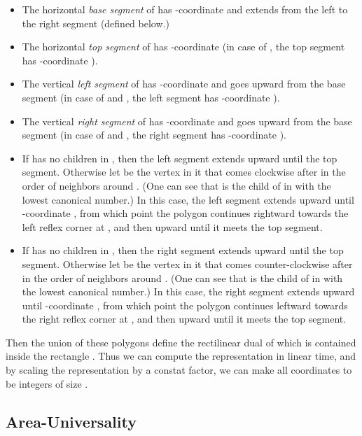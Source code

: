 \documentclass[11pt]{article}
\begin{document}
\begin{itemize}
	\item The horizontal \textit{base segment} of  has -coordinate  and extends from the left
		to the right segment (defined below.)
	\item The horizontal \textit{top segment} of  has -coordinate  (in case of , the top segment
		has -coordinate ).
	\item The vertical \textit{left segment} of  has -coordinate  and goes upward
		from the base segment (in case of  and , the left segment has -coordinate ).
	\item The vertical \textit{right segment} of  has -coordinate  and goes upward
		from the base segment (in case of  and , the right segment has -coordinate ).
	\item If  has no children in , then the left segment extends upward until the top segment. Otherwise
		let  be the vertex in it that comes clockwise after  in the order of neighbors around . (One can
		see that  is the child of  in  with the lowest canonical number.) In this case, the left
		segment extends upward until -coordinate , from which point the polygon continues rightward towards
		the left reflex corner at , and then upward until it meets the top segment.
	\item If  has no children in , then the right segment extends upward until the top segment. Otherwise
		let  be the vertex in it that comes counter-clockwise after  in the order of neighbors around .
		(One can see that  is the child of  in  with the lowest canonical number.) In this case,
		the right segment extends upward until -coordinate , from which point the polygon continues leftward
		towards the right reflex corner at , and then upward until it meets the top segment.
\end{itemize}

Then the union of these  polygons define the rectilinear dual  of  which is contained inside the rectangle
 . Thus we can compute the representation in linear time,
 and by scaling the representation by a constat factor, we can make all coordinates to be integers of size .


\subsection{Area-Universality}
\label{sec:universal}
\end{document}
